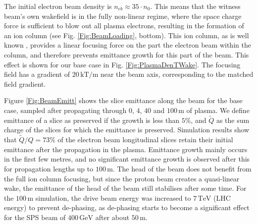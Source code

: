 \documentclass[aps,prstab,reprint,amsmath,amssymb,groupedaddress]{revtex4-1}
\newcommand{\unit}[1]{\,\mathrm{#1}}
\begin{document}
The initial electron beam density is $n_{eb} \approx 35\cdot n_{0}$. This means that the witness beam's own wakefield
is in the fully non-linear regime, where the space charge force is sufficient to blow out all plasma electrons,
resulting in the formation of an ion column (see Fig. \ref{Fig:BeamLoading}, bottom). This ion column, as is well
known \cite{rosenzweig:1991}, provides a linear focusing force on the part the electron beam within the column, and
therefore prevents emittance growth for this part of the beam. This effect is shown for our base case in Fig.
\ref{Fig:PlasmaDenTWake}. The focusing field has a gradient of $20\unit{kT/m}$ near the beam axis, corresponding to the
matched field gradient.



Figure \ref{Fig:BeamEmitt} shows the slice emittance along the beam for the base case, sampled after propagating through
$0$, $4$, $40$ and $100\unit{m}$ of plasma. We define emittance of a slice as preserved if the growth is less than
$5\%$, and $\widetilde{Q}$ as the sum charge of the slices for which the emittance is preserved. Simulation results show
that $\widetilde{Q}/Q = 73\%$ of the electron beam longitudinal slices retain their initial emittance after the
propagation in the plasma. Emittance growth mainly occurs in the first few metres, and no significant emittance growth
is observed after this for propagation lengths up to $100\unit{m}$. The head of the beam does not benefit from the full
ion column focusing, but since the proton beam creates a quasi-linear wake, the emittance of the head of the beam still
stabilises after some time. For the $100\unit{m}$ simulation, the drive beam energy was increased to $7\unit{TeV}$ (LHC
energy) to prevent de-phasing, as de-phasing starts to become a significant effect for the SPS beam of $400\unit{GeV}$
after about $50\unit{m}$.
\end{document}
